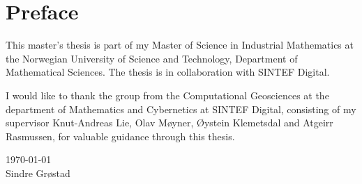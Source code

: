 {}
\chapter*{Preface}
This master's thesis is part of my Master of Science in Industrial Mathematics at the Norwegian University of Science and Technology, Department of Mathematical Sciences. The thesis is in collaboration with SINTEF Digital. 

I would like to thank the group from the Computational Geosciences at the department of Mathematics and Cybernetics at SINTEF Digital, consisting of my supervisor Knut-Andreas Lie, Olav Møyner, Øystein Klemetsdal and Atgeirr Rasmussen, for valuable guidance through this thesis.

\today \\
Sindre Grøstad